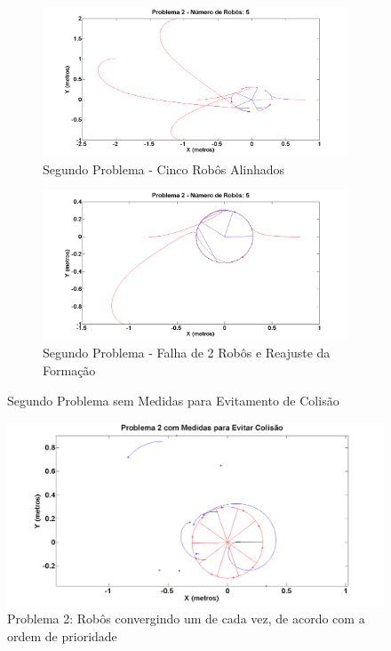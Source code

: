 \begin{figure}[!htb]
	\centering
	\begin{subfigure}{1.0\textwidth}
		\centering
		\includegraphics[width=.9\linewidth]{./04-figuras/Simulacoes/Problema2/Falha/P2FalhaInicio}
		\caption{Segundo Problema - Cinco Robôs Alinhados}
		\label{fig:P2SF}
	\end{subfigure}
	\begin{subfigure}{1.0\textwidth}
		\centering
		\includegraphics[width=.9\linewidth]{./04-figuras/Simulacoes/Problema2/Falha/P2FalhaFim}
		\caption{Segundo Problema - Falha de 2 Robôs e Reajuste da Formação}
		\label{fig:P2SF2}
	\end{subfigure}
	\caption{Segundo Problema sem Medidas para Evitamento de Colisão}
	\label{fig:sP2F}
\end{figure}

\begin{figure}[!htb]
	\centering
	\includegraphics[width=.9\linewidth]{./04-figuras/Simulacoes/Problema2/Colisao/P2_C1}
	\caption{Problema 2: Robôs convergindo um de cada vez, de acordo com a ordem de prioridade}
	\label{fig:P2C}
\end{figure}
